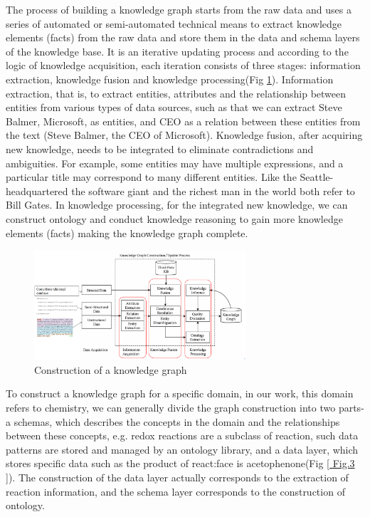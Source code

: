 \documentclass[%
 aip,
 jmp,%
 amsmath,amssymb,
 reprint,%
]{revtex4-2}
\begin{document}
The process of building a knowledge graph starts from the raw data and uses a series of automated or 
semi-automated technical means to extract knowledge elements (facts) from the raw data and store them 
in the data and schema layers of the knowledge base. It is an iterative updating process and according 
to the logic of knowledge acquisition, each iteration consists of three stages: information extraction, 
knowledge fusion and knowledge processing(Fig \ref{ Fig.1 }). Information extraction, that is, to extract 
entities, attributes and the relationship between entities from various types of data sources, 
such as that we can extract Steve Balmer, Microsoft, as entities, and CEO as a relation between these entities from
the text (Steve Balmer, the CEO of Microsoft). Knowledge fusion, after acquiring new knowledge, needs to be 
integrated to eliminate contradictions and ambiguities. For example, some entities may have multiple 
expressions, and a particular title may correspond to many different entities. Like the Seattle-headquartered 
the software giant and the richest man in the world both refer to Bill Gates. In knowledge processing, for the integrated new knowledge, 
we can construct ontology and conduct knowledge reasoning to gain more knowledge elements (facts) making the knowledge graph complete. 

\begin{figure}[htbp]
 \centering
 \includegraphics[width=0.7\textwidth]{figure/1.png}
 \caption{ Construction of a knowledge graph }
 \label{ Fig.1 }
\end{figure}

To construct a knowledge graph for a specific domain, in our work, this domain refers to chemistry, we can generally divide the graph 
construction into two parts-a schemas, which describes the concepts in the domain and the relationships 
between these concepts, e.g. redox reactions are a subclass of reaction, such data patterns are stored and 
managed by an ontology library, and a data layer, which stores specific data such as the 
product of react:face is acetophenone(Fig \ref{ Fig.3 }). The construction of the data layer actually 
corresponds to the extraction of reaction information, and the schema layer corresponds 
to the construction of ontology. 
\end{document}
